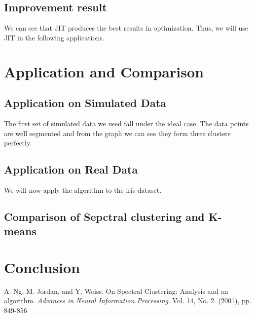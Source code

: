 \documentclass[11pt]{article}
\begin{document}
\subsection{Improvement result}
We can see that JIT produces the best results in optimization. Thus, we will use JIT in the following applications.

\section{Application and Comparison}
\subsection{Application on Simulated Data}
The first set of simulated data we used fall under the ideal case. The data points are well segmented and from the graph we can see they form three clusters perfectly.
\subsection{Application on Real Data}
We will now apply the algorithm to the iris dataset.
\subsection{Comparison of Sepctral clustering and K-means}



\section{Conclusion}

%
%


\newpage
\begin{thebibliography}{9}



A. Ng, M. Jordan, and Y. Weiss.
On Spectral Clustering: Analysis and an algorithm.
\textit{Advances in Neural Information Processing}.
Vol. 14, No. 2. (2001), pp. 849-856 

\end{thebibliography}
\end{document}
